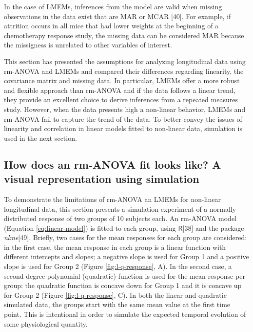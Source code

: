\documentclass[
]{article}
\begin{document}
In the case of LMEMs, inferences from the model are valid when missing observations in the data exist that are MAR or MCAR {[}40{]}. For example, if attrition occurs in all mice that had lower weights at the beginning of a chemotherapy response study, the missing data can be considered MAR because the missigness is unrelated to other variables of interest.

This section has presented the assumptions for analyzing longitudinal data using rm-ANOVA and LMEMs and compared their differences regarding linearity, the covariance matrix and missing data. In particular, LMEMs offer a more robust and flexible approach than rm-ANOVA and if the data follows a linear trend, they provide an excellent choice to derive inferences from a repeated measures study. However, when the data presents high a non-linear behavior, LMEMs and rm-ANOVA fail to capture the trend of the data. To better convey the issues of linearity and correlation in linear models fitted to non-linear data, simulation is used in the next section.

\hypertarget{simulation}{%
\subsection{How does an rm-ANOVA fit looks like? A visual representation using simulation}\label{simulation}}

To demonstrate the limitations of rm-ANOVA an LMEMs for non-linear longitudinal data, this section presents a simulation experiment of a normally distributed response of two groups of 10 subjects each. An rm-ANOVA model (Equation \eqref{eq:linear-model}) is fitted to each group, using \(\textsf{R}\){[}38{]} and the package \emph{nlme}{[}49{]}.
Briefly, two cases for the mean responses for each group are considered: in the first case, the mean response in each group is a linear function with different intercepts and slopes; a negative slope is used for Group 1 and a positive slope is used for Group 2 (Figure \ref{fig:l-q-response}, A). In the second case, a second-degree polynomial (quadratic) function is used for the mean response per group: the quadratic function is concave down for Group 1 and it is concave up for Group 2 (Figure \ref{fig:l-q-response}, C). In both the linear and quadratic simulated data, the groups start with the same mean value at the first time point. This is intentional in order to simulate the expected temporal evolution of some physiological quantity.
\end{document}
